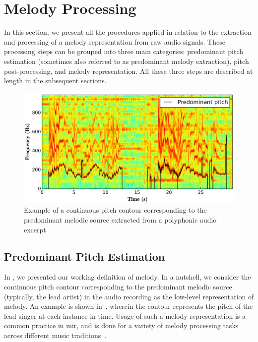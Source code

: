 {\section{Melody Processing}
\label{sec:data_preprocessing_melody_processing}

In this section, we present all the procedures applied in relation to the extraction and processing of a melody representation from raw audio signals. These processing steps can be grouped into three main categories: predominant pitch estimation (sometimes also referred to as predominant melody extraction), pitch post-processing, and melody representation. All these three steps are described at length in the subsequent sections. 

\begin{figure}
	\begin{center}
		\includegraphics[width=\figSizeHundred]{ch05_preprocessing/figures/predominantMelodyExample.png}
	\end{center}
	\caption[Example of the predominant pitch representation of melody]{Example of a continuous pitch contour corresponding to the predominant melodic source extracted from a polyphonic audio excerpt}
	\label{fig:predominant_melodic_fragment}
\end{figure}


\subsection{Predominant Pitch Estimation}
\label{sec:data_preprocessing_predominant_melody_estimation}

In , we presented our working definition of melody. In a nutshell, we consider the continuous pitch contour corresponding to the predominant melodic source (typically, the lead artist) in the audio recording as the low-level representation of melody. An example is shown in~, wherein the contour represents the pitch of the lead singer at each instance in time. Usage of such a melody representation is a common practice in \gls{mir}, and is done for a variety of melody processing tasks across different music traditions~\citep{Dutta2014,Ishwar2013,Rao2014,koduri2014intonation,senturk2013score,pikrakis2012tracking,pikrakis2003recognition,moelants2009exploring}. 

}
